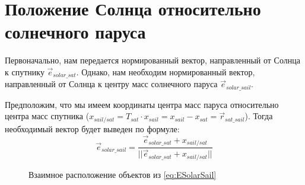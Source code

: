 \documentclass[tikz, a4paper,12pt]{extreport}
\begin{document}
  \section{Положение Солнца относительно солнечного паруса}
  \noindent\indent Первоначально, нам передается нормированный вектор, направленный от Солнца к спутнику $\vec{e}_{solar\_sat}$.
  Однако, нам необходим нормированный вектор, направленный от Солнца к центру масс солнечного
  паруса $\vec{e}_{solar\_sail}$.\par
  Предположим, что мы имеем координаты центра масс паруса относительно центра масс спутника ($x_{sail/sat} = T_{sat} \cdot x_{sail} = x_{sail} - x_{sat} = \vec{r}_{sat\_sail}$).
  Тогда необходимый вектор будет выведен по формуле:
  \begin{equation} \label{eq:ESolarSail}
    \vec{e}_{solar\_sail} = \frac{\vec{e}_{solar\_sat} + x_{sail/sat}}{||\vec{e}_{solar\_sat} + x_{sail/sat}||}
  \end{equation}
  \begin{figure}[!h]%
    \centering
    \caption{Взаимное расположение объектов из \ref{eq:ESolarSail}}
    \label{fig:SolarSatSailSystem}
  \end{figure}
\end{document}
